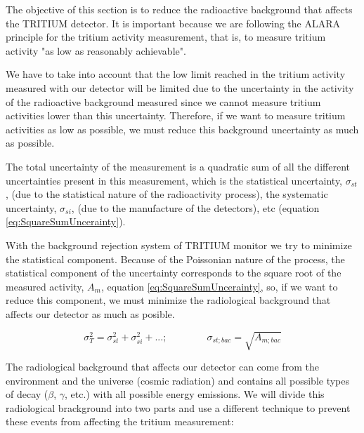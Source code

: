 The objective of this section is to reduce the radioactive background that affects the TRITIUM detector. It is important because we are following the ALARA principle for the tritium activity measurement, that is, to measure tritium activity "as low as reasonably achievable".

We have to take into account that the low limit reached in the tritium activity measured with our detector will be limited due to the uncertainty in the activity of the radioactive background measured since we cannot measure tritium activities lower than this uncertainty. Therefore, if we want to measure tritium activities as low as possible, we must reduce this background uncertainty as much as possible.

The total uncertainty of the measurement is a quadratic sum of all the different uncertainties present in this measurement, which is the statistical uncertainty, $\sigma_{st}$, (due to the statistical nature of the radioactivity process), the systematic uncertainty, $\sigma_{si}$, (due to the manufacture of the detectors), etc (equation \ref{eq:SquareSumUncerainty}).

With the background rejection system of TRITIUM monitor we try to minimize the statistical component. Because of the Poissonian nature of the process, the statistical component of the uncertainty corresponds to the square root of the measured activity, $A_{m}$, equation \ref{eq:SquareSumUncerainty}, so, if we want to reduce this component, we must minimize the radiological background that affects our detector as much as posible.

\begin{equation}
\sigma_{T}^2 = \sigma_{st}^2 +\sigma_{si}^2 + ... ; \qquad \qquad \sigma_{st;bac} = \sqrt{A_{m;bac}}
\label{eq:SquareSumUncerainty}
\end{equation} 

The radiological background that affects our detector can come from the environment and the universe (cosmic radiation) and contains all possible types of decay ($\beta$, $\gamma$, etc.) with all possible energy emissions. We will divide this radiological brackground into two parts and use a different technique to prevent these events from affecting the tritium measurement:

